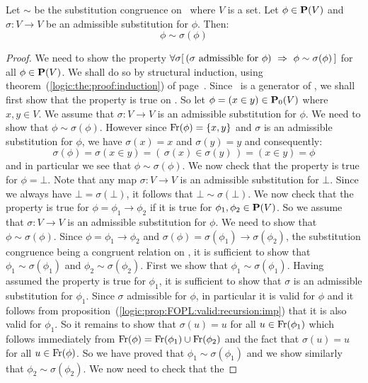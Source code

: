 \begin{prop}\label{logic:prop:admissible:sub:congruence}
Let $\sim$ be the substitution congruence on \pv\ where $V$ is a
set. Let $\phi\in\mbox{${\bf P}(V)$}$ and $\sigma:V\to V$ be an admissible
substitution for $\phi$. Then:
    \[
    \phi\sim\sigma(\phi)
    \]
\end{prop}
\begin{proof}
We need to show the property $\forall\sigma[\,(\sigma\mbox{\
admissible for\ }\phi)\ \Rightarrow\ \phi\sim\sigma(\phi)\,]$ for
all $\phi\in\mbox{${\bf P}(V)$}$. We shall do so by structural induction, using
theorem~(\ref{logic:the:proof:induction}) of
page~\pageref{logic:the:proof:induction}. Since \pvo\ is a generator
of \pv, we shall first show that the property is true on \pvo. So
let $\phi=(x\in y)\in\mbox{${\bf P}_{0}(V)$}$ where $x,y\in V$. We assume that
$\sigma:V\to V$ is an admissible substitution for $\phi$. We need to
show that $\phi\sim\sigma(\phi)$. However since
$\mbox{\rm Fr}(\phi)=\{x,y\}$ and $\sigma$ is an admissible substitution for
$\phi$, we have $\sigma(x)=x$ and $\sigma(y)=y$ and consequently:
    \[
    \sigma(\phi)=\sigma(x\in y)=(\,\sigma(x)\in\sigma(y)\,)=(x\in y)=\phi
    \]
and in particular we see that $\phi\sim\sigma(\phi)$. We now check
that the property is true for $\phi=\bot$. Note that any map
$\sigma:V\to V$ is an admissible substitution for $\bot$. Since we
always have $\bot=\sigma(\bot)$, it follows that
$\bot\sim\sigma(\bot)$. We now check that the property is true for
$\phi=\phi_{1}\to\phi_{2}$ if it is true for
$\phi_{1},\phi_{2}\in\mbox{${\bf P}(V)$}$. So we assume that $\sigma:V\to V$ is an
admissible substitution for $\phi$. We need to show that
$\phi\sim\sigma(\phi)$. Since $\phi=\phi_{1}\to\phi_{2}$ and
$\sigma(\phi)=\sigma(\phi_{1})\to\sigma(\phi_{2})$, the substitution
congruence being a congruent relation on \pv, it is sufficient to
show that $\phi_{1}\sim\sigma(\phi_{1})$ and
$\phi_{2}\sim\sigma(\phi_{2})$. First we show that
$\phi_{1}\sim\sigma(\phi_{1})$. Having assumed the property is true
for $\phi_{1}$, it is sufficient to show that $\sigma$ is an
admissible substitution for $\phi_{1}$. Since $\sigma$ admissible
for $\phi$, in particular it is valid for $\phi$ and it follows from
proposition~(\ref{logic:prop:FOPL:valid:recursion:imp}) that it is
also valid for $\phi_{1}$. So it remains to show that $\sigma(u)=u$
for all $u\in\mbox{\rm Fr}(\phi_{1})$ which follows immediately from
$\mbox{\rm Fr}(\phi)=\mbox{\rm Fr}(\phi_{1})\cup\mbox{\rm Fr}(\phi_{2})$ and the fact that
$\sigma(u)=u$ for all $u\in\mbox{\rm Fr}(\phi)$. So we have proved that
$\phi_{1}\sim\sigma(\phi_{1})$ and we show similarly that
$\phi_{2}\sim\sigma(\phi_{2})$. We now need to check that the

\end{proof}
